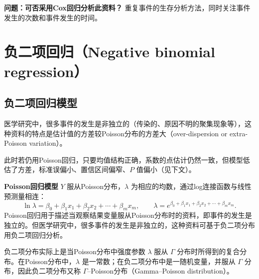 \textbf{问题：可否采用Cox回归分析此资料？} 重复事件的生存分析方法，同时关注事件发生的次数和事件发生的时间。
\section{负二项回归（Negative binomial regression）}
\subsection{负二项回归模型}
医学研究中，很多事件的发生是非独立的（传染的、原因不明的聚集现象等），这种资料的特点是估计值的方差较Poisson分布的方差大（over-dispersion or extra-Poisson variation）。
\begin{annotation}此时若仍用Poisson回归，只要均值结构正确，系数的点估计仍然一致，但模型低估了方差，标准误偏小、置信区间偏窄、$P$ 值偏小（见下文）。\end{annotation}
\textbf{Poisson回归模型} $Y$ 服从Poisson分布，$\lambda$ 为相应的均数，通过log连接函数与线性预测量相连：
\[
\ln\lambda=\beta_0+\beta_1x_1+\beta_2x_2+\cdots+\beta_mx_m,\qquad
\lambda=e^{\beta_0+\beta_1x_1+\beta_2x_2+\cdots+\beta_mx_m}.
\]
Poisson回归用于描述当观察结果变量服从Poisson分布时的资料，即事件的发生是独立的。但医学研究中，很多事件的发生是非独立的，这种资料可基于负二项分布用负二项回归分析。

负二项分布实际上是当Poisson分布中强度参数 $\lambda$ 服从 $\Gamma$ 分布时所得到的复合分布。在Poisson分布中，$\lambda$ 是一常数；在负二项分布中是一随机变量，并服从 $\Gamma$ 分布，因此负二项分布又称 $\Gamma$--Poisson分布（Gamma--Poisson distribution）。

